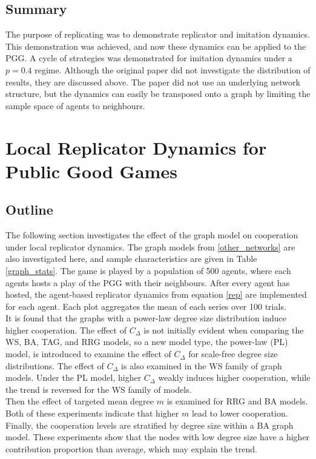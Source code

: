 \subsection{Summary}
The purpose of replicating \cite{RN30} was to demonstrate replicator and imitation dynamics. This demonstration was achieved, and now these dynamics can be applied to the PGG. A cycle of strategies was demonstrated for imitation dynamics under a $p=0.4$ regime. Although the original paper did not investigate the distribution of results, they are discussed above. The paper \cite{RN30} did not use an underlying network structure, but the dynamics can easily be transposed onto a graph by limiting the sample space of agents to neighbours. \\


\section{Local Replicator Dynamics for Public Good Games}
\subsection{Outline}
The following section investigates the effect of the graph model on cooperation under local replicator dynamics. The graph models from \ref{other_networks} are also investigated here, and sample characteristics are given in Table \ref{graph_stats}. The game is played by a population of 500 agents, where each agents hosts a play of the PGG with their neighbours. After every agent has hosted, the agent-based replicator dynamics from equation \eqref{rep} are implemented for each agent. Each plot aggregates the mean of each series over 100 trials. \\

It is found that the graphs with a power-law degree size distribution induce higher cooperation. The effect of $C_\Delta$ is not initially evident when comparing the WS, BA, TAG, and RRG models, so a new model type, the power-law (PL) model, is introduced to examine the effect of $C_\Delta$ for scale-free degree size distributions. The effect of $C_\Delta$ is also examined in the WS family of graph models. Under the PL model, higher $C_\Delta$ weakly induces higher cooperation, while the trend is reversed for the WS family of models. \\

Then the effect of targeted mean degree $m$ is examined for RRG and BA models. Both of these experiments indicate that higher $m$ lead to lower cooperation. Finally, the cooperation levels are stratified by degree size within a BA graph model. These experiments show that the nodes with low degree size have a higher contribution proportion than average, which may explain the trend. \\

